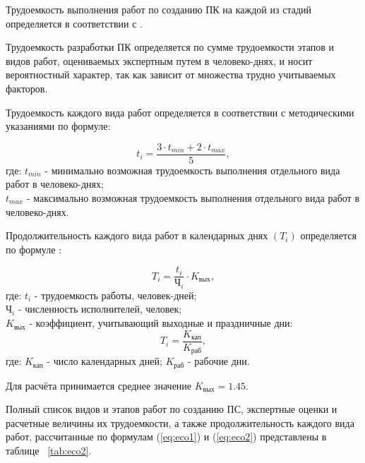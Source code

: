 Трудоемкость выполнения работ по созданию ПК  на каждой из стадий определяется в соответствии с \cite{bibl52, bibl53}.

Трудоемкость разработки ПК определяется по сумме трудоемкости этапов и видов работ, оцениваемых экспертным путем в
человеко-днях, и носит вероятностный характер, так как зависит от множества трудно учитываемых факторов.

Трудоемкость каждого вида работ определяется в соответствии с методическими указаниями \cite{bibl53} по формуле:

\begin{equation}
t_i = \frac{3\cdot{t_{min}} + 2\cdot{t_{max}}}{5},
\label{eq:eco1}
\end{equation}
где:	$t_{min}$ - минимально возможная трудоемкость выполнения отдельного вида работ в человеко-днях; \\
	$t_{max}$ - максимально возможная трудоемкость выполнения отдельного вида работ в человеко-днях.

Продолжительность каждого вида работ в календарных днях ${(T_i)}$ определяется по формуле \cite{bibl53}:

\begin{equation}
T_i = \frac{t_i}{\mbox{Ч}_i}\cdot{K_{\mbox{вых}}},
\label{eq:eco2}
\end{equation}
где:	${t_i}$ - трудоемкость работы, человек-дней; \\
	${\mbox{Ч}_i}$ - численность исполнителей, человек; \\
	${K_{\mbox{вых}}}$ - коэффициент, учитывающий выходные и праздничные дни: \\

\begin{equation}
T_i = \frac{K_{\mbox{кап}}}{K_{\mbox{раб}}},
\label{eq:eco3}
\end{equation}
где:	${K_{\mbox{кап}}}$ - число календарных дней;
	${K_{\mbox{раб}}}$ - рабочие дни.

Для расчёта принимается среднее значение ${K_{\mbox{вых}} = 1.45}$. 

Полный список видов и этапов работ по созданию ПС, экспертные оценки и расчетные величины их трудоемкости,
а также продолжительность каждого вида работ, рассчитанные по формулам (\ref{eq:eco1}) и (\ref{eq:eco2}) представлены
в таблице ~\ref{tab:eco2}.

